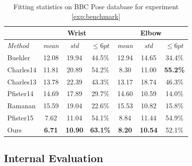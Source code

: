 \begin{table}[b!]
    \small
    \centering
    \begin{tabular}{|l|c|c|c||c|c|c|}
        \hline
                            & \multicolumn{3}{c||}{Wrist} & \multicolumn{3}{c|}{Elbow}\\
        \hline
        \emph{Method}       & \emph{mean} & \emph{std} & $\leq 6pt$ & \emph{mean} & \emph{std} & $\leq 6pt$\\
        \hline\hline
        Buehler             & 12.08    & 19.94        & 44.5\%       & 12.94    & 14.65        & 34.4\%\\
        Charles14           & 11.81    & 20.89        & 54.2\%       &  8.30    & 11.00        & \textbf{55.2\%}\\
        Charles13           & 13.78    & 22.39        & 43.3\%       & 13.17    & 18.74        & 46.3\%\\
        Pfister14           & 14.69    & 17.89        & 29.7\%       & 14.60    & 10.59        & 14.0\%\\
        Ramanan             & 15.59    & 19.04        & 22.6\%       & 15.53    & 10.82        & 15.8\%\\
        Pfister15           & 7.62     & 11.04        & 54.1\%       &  8.84    & 11.44        & 54.9\%\\
        \hline\hline
        Ours                & \textbf{6.71}& \textbf{10.90}   & \textbf{63.1\%}       & \textbf{8.20}     &  \textbf{10.54}        & 52.1\%\\
        \hline
    \end{tabular}
    \caption{Fitting statistics on BBC Pose database for experiment \ref{exp:benchmark}}
    \label{tab:hand_benchmark}
\end{table}


\subsection{Internal Evaluation}
\label{exp:internal}

